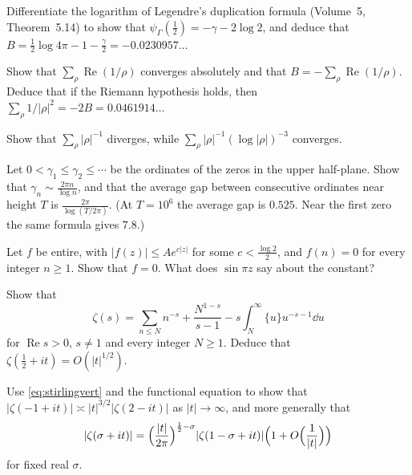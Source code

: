 \begin{exercise}[$\star$]\label{ex:digammahalf}
Differentiate the logarithm of Legendre's duplication formula (Volume~5, Theorem~5.14) to show that $\psi_\Gamma(\frac12)=-\gamma-2\log2$, and deduce that $B=\frac12\log4\pi-1-\frac\gamma2=-0.0230957\ldots$
\end{exercise}

\begin{exercise}[$\star\star$]\label{ex:bsum}
Show that $\sum_\rho\operatorname{Re}(1/\rho)$ converges absolutely and that $B=-\sum_\rho\operatorname{Re}(1/\rho)$. Deduce that if the Riemann hypothesis holds, then $\sum_\rho 1/|\rho|^2=-2B=0.0461914\ldots$
\end{exercise}

\begin{exercise}[$\star$]\label{ex:zerosums}
Show that $\sum_\rho|\rho|^{-1}$ diverges, while $\sum_\rho|\rho|^{-1}(\log|\rho|)^{-3}$ converges.
\end{exercise}

\begin{exercise}\label{ex:nthzero}
Let $0<\gamma_1\le\gamma_2\le\cdots$ be the ordinates of the zeros in the upper half-plane. Show that $\gamma_n\sim\frac{2\pi n}{\log n}$, and that the average gap between consecutive ordinates near height $T$ is $\frac{2\pi}{\log(T/2\pi)}$. (At $T=10^6$ the average gap is $0.525$. Near the first zero the same formula gives $7.8$.)
\end{exercise}

\begin{exercise}[$\star\star$]\label{ex:carlson}
Let $f$ be entire, with $|f(z)|\le Ae^{c|z|}$ for some $c<\frac{\log2}2$, and $f(n)=0$ for every integer $n\ge1$. Show that $f=0$. What does $\sin\pi z$ say about the constant?
\end{exercise}

\begin{exercise}[$\star\star$]\label{ex:zetahalf}
Show that
\[
\zeta(s)=\sum_{n\le N}n^{-s}+\frac{N^{1-s}}{s-1}-s\int_N^\infty\{u\}u^{-s-1}\dd u
\]
for $\operatorname{Re}s>0$, $s\ne1$ and every integer $N\ge1$. Deduce that $\zeta(\frac12+it)=O(|t|^{1/2})$.
\end{exercise}

\begin{exercise}[$\star\star\star$]\label{ex:gammaratio}
Use \eqref{eq:stirlingvert} and the functional equation to show that $|\zeta(-1+it)|\asymp|t|^{3/2}|\zeta(2-it)|$ as $|t|\to\infty$, and more generally that
\[
|\zeta(\sigma+it)|=\Bigl(\frac{|t|}{2\pi}\Bigr)^{\frac12-\sigma}|\zeta(1-\sigma+it)|\Bigl(1+O\Bigl(\frac1{|t|}\Bigr)\Bigr)
\]
for fixed real $\sigma$.
\end{exercise}

